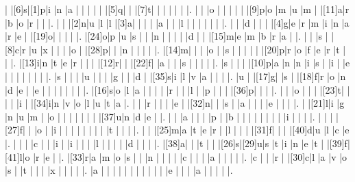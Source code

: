 \documentclass[12pt]{article}
\begin{document}
\begin{Puzzle}{22}{24}
  |{}  |[6]s|[1]p|i   |n   |a   |{}  |{}  |{}  |{}  |{}  |[5]q|{}  |{}  |[7]t|{}  |{}  |{}  |{}  |{}  |{}  |.
  |{}  |{}  |o   |{}  |{}  |{}  |{}  |{}  |[9]p|o   |m   |u   |m   |{}  |[11]a|r   |b   |o   |r   |{}  |{}  |.
  |{}  |{}  |[2]n|u   |l   |l   |[3]a|{}  |{}  |{}  |{}  |a   |{}  |{}  |l   |{}  |{}  |{}  |{}  |{}  |{}  |.
  |{}  |{}  |d   |{}  |{}  |{}  |[4]g|e   |r   |m   |i   |n   |a   |r   |e   |{}  |[19]o|{}  |{}  |{}  |{}  |.
  |[24]o|p   |u   |s   |{}  |{}  |n   |{}  |{}  |{}  |{}  |d   |{}  |{}  |[15]m|e   |m   |b   |r   |a   |{}  |.
  |{}  |{}  |s   |{}  |[8]c|r   |u   |x   |{}  |{}  |{}  |o   |{}  |[28]p|{}  |{}  |n   |{}  |{}  |{}  |{}  |.
  |[14]m|{}  |{}  |{}  |o   |{}  |s   |{}  |{}  |{}  |{}  |{}  |[20]p|r   |o   |f   |e   |r   |t   |{}  |{}  |.
  |[13]i|n   |t   |e   |r   |{}  |{}  |{}  |[12]r|{}  |{}  |[22]f|{}  |a   |{}  |{}  |s   |{}  |{}  |{}  |{}  |.
  |s   |{}  |{}  |{}  |[10]p|a   |n   |n   |i   |s   |{}  |i   |{}  |e   |{}  |{}  |{}  |{}  |{}  |{}  |{}  |.
  |s   |{}  |{}  |{}  |u   |{}  |{}  |{}  |g   |{}  |{}  |d   |{}  |[35]s|i   |l   |v   |a   |{}  |{}  |{}  |.
  |u   |{}  |[17]g|{}  |s   |{}  |[18]f|r   |o   |n   |d   |e   |{}  |e   |{}  |{}  |{}  |{}  |{}  |{}  |{}  |.
  |[16]s|o   |l   |a   |{}  |{}  |{}  |{}  |r   |{}  |{}  |l   |{}  |p   |{}  |{}  |{}  |[36]p|{}  |{}  |{}  |.
  |{}  |{}  |o   |{}  |{}  |{}  |[23]t|{}  |{}  |{}  |{}  |i   |{}  |[34]i|n   |v   |o   |l   |u   |t   |a   |.
  |{}  |{}  |r   |{}  |{}  |{}  |e   |{}  |[32]n|{}  |{}  |s   |{}  |a   |{}  |{}  |{}  |e   |{}  |{}  |{}  |.
  |{}  |[21]l|i   |g   |n   |u   |m   |{}  |o   |{}  |{}  |{}  |{}  |{}  |{}  |{}  |[37]u|n   |d   |e   |{}  |.
  |{}  |{}  |a   |{}  |{}  |{}  |p   |{}  |b   |{}  |{}  |{}  |{}  |{}  |{}  |{}  |{}  |i   |{}  |{}  |{}  |.
  |{}  |{}  |{}  |[27]f|{}  |{}  |o   |{}  |i   |{}  |{}  |{}  |{}  |{}  |{}  |{}  |{}  |t   |{}  |{}  |{}  |.
  |{}  |{}  |[25]m|a   |t   |e   |r   |{}  |l   |{}  |{}  |{}  |[31]f|{}  |{}  |{}  |[40]d|u   |l   |c   |e   |.
  |{}  |{}  |{}  |c   |{}  |{}  |i   |{}  |i   |{}  |{}  |{}  |l   |{}  |{}  |{}  |{}  |d   |{}  |{}  |{}  |.
  |[38]a|{}  |{}  |t   |{}  |{}  |[26]s|[29]u|s   |t   |i   |n   |e   |t   |{}  |[39]f|[41]l|o   |r   |e   |{}  |.
  |[33]r|a   |m   |o   |s   |{}  |{}  |n   |{}  |{}  |{}  |{}  |c   |{}  |{}  |{}  |a   |{}  |{}  |{}  |{}  |.
  |c   |{}  |{}  |r   |{}  |[30]c|l   |a   |v   |o   |s   |{}  |t   |{}  |{}  |{}  |x   |{}  |{}  |{}  |{}  |.
  |a   |{}  |{}  |{}  |{}  |{}  |{}  |{}  |{}  |{}  |{}  |{}  |e   |{}  |{}  |{}  |a   |{}  |{}  |{}  |{}  |.
\end{Puzzle}
\end{document}
